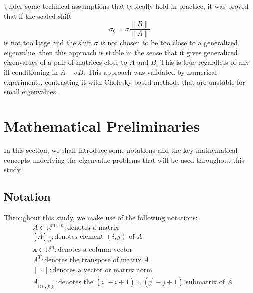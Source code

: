 Under some technical assumptions that typically hold in practice, it was proved that if the scaled shift
\begin{equation}
  \label{eq:ScaledShift}
  \sigma_0 = \sigma \frac{\|B\|}{\|A\|}
\end{equation}
is not too large and the shift $\sigma$ is not chosen to be too close to a generalized eigenvalue, then this approach is stable in the sense that it gives generalized eigenvalues of a pair of matrices close to $A$ and $B$.  This is true regardless of any ill conditioning in $A-\sigma B$.  This approach was validated by numerical experiments, contrasting it with Cholesky-based methods that are unstable for small eigenvalues.  

\section{Mathematical Preliminaries}\label{sec:MathPrelim}
In this section, we shall introduce some notations and the key mathematical concepts underlying the eigenvalue problems that will be used throughout this study.
\subsection{Notation}\label{sec:Notation}
Throughout this study, we make use of the following notations:
\begin{align*}\nonumber
	&A \in \mathbb{R}^{m\times n}: \text{denotes a matrix}\\
	&[A]_{ij}: \text{denotes element $(i, j)$ of $A$}\\
	&\mathbf{x} \in \mathbb{R}^{m}: \text{denotes a column vector}\\
	&A^{T}: \text{denotes the transpose of matrix $A$}\\
	&\| \cdot \|: \text{denotes a vector or matrix norm }\\
	&A_{i:i^\prime, j:j^\prime}: \text{denotes the $(i^\prime - i + 1) \times (j^\prime - j + 1)$ submatrix of $A$}
\end{align*}

